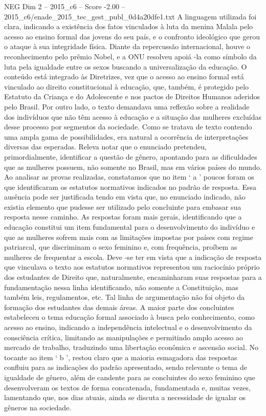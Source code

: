 \begin{textsample}{NEG Dim 2 – 2015\_c6 – Score -2.00 – 2015\_c6/enade\_2015\_tec\_gest\_publ\_0d4a20dfe1.txt}
A linguagem utilizada foi clara, indicando a existência dos fatos vinculados à luta da menina Malala pelo acesso ao ensino formal das jovens do seu país, e o confronto ideológico que gerou o ataque à sua integridade física.
Diante da repercussão internacional, houve o reconhecimento pelo prêmio Nobel, e a ONU resolveu apoiá -la como símbolo da luta pela igualdade entre os sexos buscando a universalização da educação.
O conteúdo está integrado às Diretrizes, vez que o acesso ao ensino formal está vinculado ao direito constitucional à educação, que, também, é protegido pelo Estatuto da Criança e do Adolescente e nos pactos de Direitos Humanos aderidos pelo Brasil.
Por outro lado, o texto demandava uma reflexão sobre a realidade dos indivíduos que não têm acesso à educação e a situação das mulheres excluídas desse processo por segmentos da sociedade.
Como se tratava de texto contendo uma ampla gama de possibilidades, era natural a ocorrência de interpretações diversas das esperadas.
Releva notar que o enunciado pretendeu, primordialmente, identificar a questão de gênero, apontando para as dificuldades que as mulheres possuem, não somente no Brasil, mas em vários países do mundo.
Ao analisar as provas realizadas, constatamos que no item ‘ a ’ poucos foram os que identificaram os estatutos normativos indicados no padrão de resposta.
Essa ausência pode ser justificada tendo em vista que, no enunciado indicado, não existia elemento que pudesse ser utilizado pelo concluinte para embasar sua resposta nesse caminho.
As respostas foram mais gerais, identificando que a educação constitui um item fundamental para o desenvolvimento do indivíduo e que as mulheres sofrem mais com as limitações impostas por países com regime patriarcal, que discriminam o sexo feminino e, com frequência, proíbem as mulheres de frequentar a escola.
Deve -se ter em vista que a indicação de resposta que vinculava o texto aos estatutos normativos representou um raciocínio próprio dos estudantes de Direito que, naturalmente, encaminharam suas respostas para a fundamentação nessa linha identificando, não somente a Constituição, mas também leis, regulamentos, etc.
Tal linha de argumentação não foi objeto da formação dos estudantes das demais áreas.
A maior parte dos concluintes estabeleceu o tema educação formal associado à busca pelo conhecimento, como acesso ao ensino, indicando a independência intelectual e o desenvolvimento da consciência crítica, limitando as manipulações e permitindo amplo acesso ao mercado de trabalho, traduzindo uma libertação econômica e ascensão social.
No tocante ao item ‘ b ’, restou claro que a maioria esmagadora das respostas confluiu para as indicações do padrão apresentado, sendo relevante o tema de igualdade de gênero, além de candente para as concluintes do sexo feminino que desenvolveram os textos de forma concatenada, fundamentada e, muitas vezes, lamentando que, nos dias atuais, ainda se discuta a necessidade de igualar os gêneros na sociedade.

\end{textsample}
